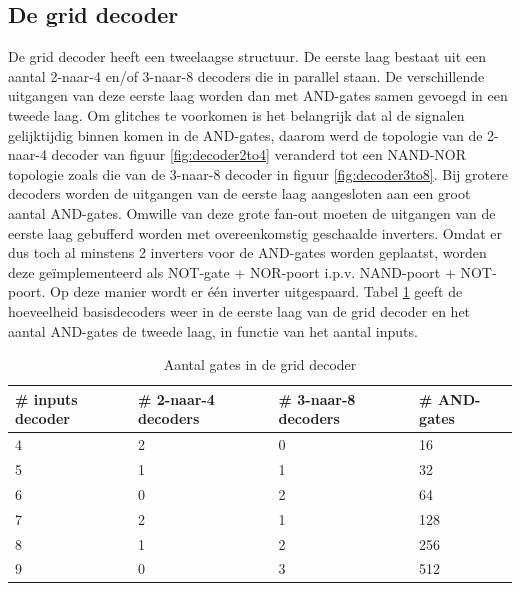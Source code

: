 \subsection{De grid decoder}
De grid decoder heeft een tweelaagse structuur. De eerste laag bestaat uit een aantal 2-naar-4 en/of 3-naar-8 decoders die in parallel staan. De verschillende uitgangen van deze eerste laag worden dan met AND-gates samen gevoegd in een tweede laag. Om glitches te voorkomen is het belangrijk dat al de signalen gelijktijdig binnen komen in de AND-gates, daarom werd de topologie van de 2-naar-4 decoder van figuur \ref{fig:decoder2to4} veranderd tot een NAND-NOR topologie zoals die van de 3-naar-8 decoder in figuur \ref{fig:decoder3to8}. Bij grotere decoders worden de uitgangen van de eerste laag aangesloten aan een groot aantal AND-gates. Omwille van deze grote fan-out moeten de uitgangen van de eerste laag gebufferd worden met overeenkomstig geschaalde inverters. Omdat er dus toch al minstens 2 inverters voor de AND-gates worden geplaatst, worden deze geïmplementeerd als NOT-gate + NOR-poort i.p.v. NAND-poort + NOT-poort. Op deze manier wordt er één inverter uitgespaard. Tabel \ref{tab:griddecoder} geeft de hoeveelheid basisdecoders weer in de eerste laag van de grid decoder en het aantal AND-gates de tweede laag, in functie van het aantal inputs.

\begin{table}
\begin{center}
\begin{tabular}{llll}
\hline
\# inputs decoder & \# 2-naar-4 decoders & \# 3-naar-8 decoders & \# AND-gates\\
\hline
4 & 2 & 0 & 16\\
5 & 1 & 1 & 32\\
6 & 0 & 2 & 64\\
7 & 2 & 1 & 128\\
8 & 1 & 2 & 256\\
9 & 0 & 3 & 512\\
\hline
\end{tabular}
\end{center}
\caption[Aantal gates in de grid decoder]{Aantal gates in de grid decoder}
\label{tab:griddecoder}
\end{table}

